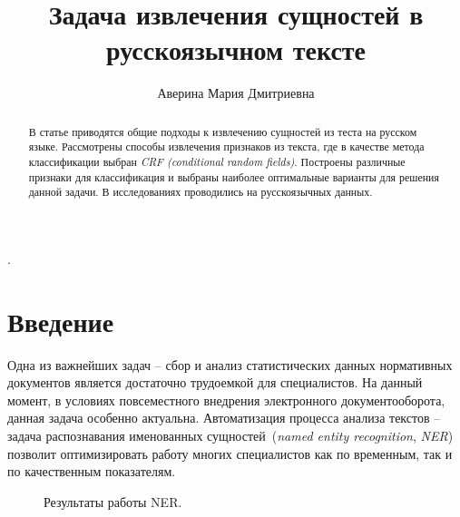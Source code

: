 \documentclass{csmathnotes}
\title{Задача извлечения сущностей в русскоязычном тексте}
\author{Аверина Мария Дмитриевна}
\affiliation{Ярославский государственный университет им. П.\,Г. Демидова}
\begin{document}
\maketitle

\begin{abstract}
В статье приводятся общие подходы к извлечению сущностей из теста на русском языке. Рассмотрены способы извлечения признаков из текста, где в качестве метода классификации выбран \emph{CRF (conditional random fields)}. Построены различные признаки для классификация и выбраны наиболее оптимальные варианты для решения данной задачи. В исследованиях проводились на русскоязычных данных. 
\end{abstract}

.

\section*{Введение}
Одна из важнейших задач – сбор и анализ статистических данных нормативных
документов является достаточно трудоемкой для специалистов. На данный момент, в условиях повсеместного внедрения электронного документооборота, данная задача особенно актуальна. Автоматизация процесса анализа текстов – задача распознавания именованных сущностей~(\emph{named entity recognition}, \emph{NER})~\cite{base} позволит оптимизировать работу многих специалистов как по временным, так и по качественным показателям.

\begin{figure}[h]
	\caption{Результаты работы NER.}
	\label{fig:ner}
\end{figure}
\end{document}
